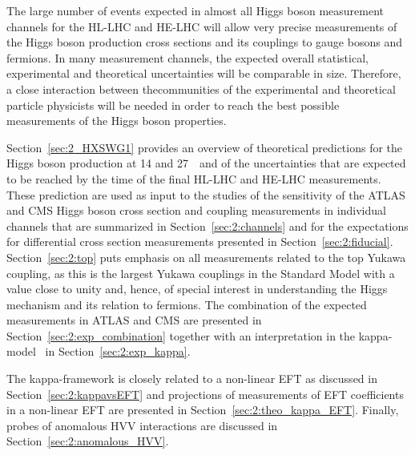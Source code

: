 The large number of events expected in almost all Higgs boson measurement channels for the HL-LHC and HE-LHC will allow very precise measurements of the Higgs boson production cross sections and its couplings to gauge bosons and fermions. In many measurement channels, the expected overall statistical, experimental and theoretical uncertainties will be comparable in size. Therefore, a close interaction between thecommunities of the experimental and theoretical particle physicists will be needed in order to reach the best possible measurements of the Higgs boson properties.

Section~\ref{sec:2_HXSWG1} provides an overview of theoretical predictions for the Higgs boson production at 14 and 27~\UTeV\ and of the uncertainties that are expected to be reached by the time of the final HL-LHC and HE-LHC measurements. 
These prediction are used as input to the studies of the sensitivity of the ATLAS and CMS Higgs boson cross section and coupling measurements in individual channels that are summarized in Section~\ref{sec:2:channels} and for the expectations for differential cross section measurements presented in Section~\ref{sec:2:fiducial}.
Section~\ref{sec:2:top} puts emphasis on all measurements related to the top Yukawa coupling, as this is the largest Yukawa couplings in the Standard Model with a value close to unity and, hence, of special interest in understanding the Higgs mechanism and its relation to fermions.
The combination of the expected measurements in ATLAS and CMS are presented in Section~\ref{sec:2:exp_combination} together with an interpretation in the kappa-model~\cite{LHCHiggsCrossSectionWorkingGroup:2012nn,Heinemeyer:2013tqa} in Section~\ref{sec:2:exp_kappa}.

The kappa-framework is closely related to a non-linear EFT as discussed in Section~\ref{sec:2:kappavsEFT} and projections of measurements of EFT coefficients in a non-linear EFT are presented in Section~\ref{sec:2:theo_kappa_EFT}. 
Finally, probes of anomalous HVV interactions are discussed in Section~\ref{sec:2:anomalous_HVV}.
